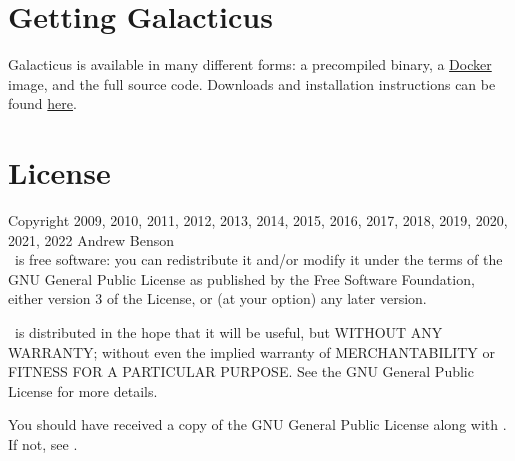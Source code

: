 \section{Getting Galacticus}

Galacticus is available in many different forms: a precompiled binary, a \href{https://www.docker.com/}{Docker} image, and the full source code. Downloads and installation instructions can be found \href{https://github.com/galacticusorg/galacticus/wiki#how-do-i-install-and-use-galacticus}{here}.

\section{License}

Copyright 2009, 2010, 2011, 2012, 2013, 2014, 2015, 2016, 2017, 2018, 2019, 2020, 2021, 2022 Andrew Benson \href{mailto:abenson@carnegiescience.edu}\\

\glc\ is free software: you can redistribute it and/or modify
it under the terms of the GNU General Public License as published by
the Free Software Foundation, either version 3 of the License, or
(at your option) any later version.

\glc\ is distributed in the hope that it will be useful,
but WITHOUT ANY WARRANTY; without even the implied warranty of
MERCHANTABILITY or FITNESS FOR A PARTICULAR PURPOSE.  See the
GNU General Public License for more details.

You should have received a copy of the GNU General Public License
along with \glc.  If not, see \href{http://www.gnu.org/licenses/}.

